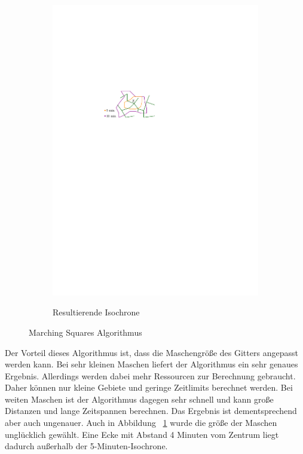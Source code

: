 \documentclass[12pt,a4paper]{article}
\begin{document}
\begin{figure}[h]
\begin{subfigure}{0.47\textwidth}
\includegraphics[width = \textwidth]{../media/gridiso.pdf} \\
\caption{Resultierende Isochrone}
\label{fig:grid4}
\end{subfigure}
\caption{Marching Squares Algorithmus}
\label{grid}
\end{figure}

Der Vorteil dieses Algorithmus ist, dass die Maschengröße des Gitters angepasst werden kann. 
Bei sehr kleinen Maschen liefert der Algorithmus ein sehr genaues Ergebnis. 
Allerdings werden dabei mehr Ressourcen zur Berechnung gebraucht. 
Daher können nur kleine Gebiete und geringe Zeitlimits berechnet werden. 
Bei weiten Maschen ist der Algorithmus dagegen sehr schnell und kann große Distanzen und lange Zeitspannen berechnen. 
Das Ergebnis ist dementsprechend aber auch ungenauer. 
Auch in Abbildung ~\ref{fig:grid4} wurde die größe der Maschen unglücklich gewählt. 
Eine Ecke mit Abstand 4 Minuten vom Zentrum liegt dadurch außerhalb der 5-Minuten-Isochrone.
\end{document}
